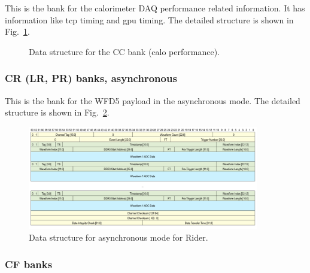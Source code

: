 This is the bank for the calorimeter DAQ performance related information.
It has information like tcp timing and gpu timing. The detailed structure is shown in Fig.~\ref{fig:CCBankFormat}.

\begin{figure}[htbp]
\centering
{}
\caption{Data structure for the CC bank (calo performance).}\label{fig:CCBankFormat}
\end{figure}

\subsubsection*{CR (LR, PR) banks, asynchronous}

This is the bank for the WFD5 payload in the asynchronous mode. The detailed structure is shown in Fig.~\ref{fig:AsyncRiderData}.

\begin{figure}[htbp]
\centering
\includegraphics[width=0.9\textwidth]{pics/AsyncRiderData.pdf} 
\caption{Data structure for asynchronous mode for Rider.}\label{fig:AsyncRiderData}
\end{figure}

\subsubsection*{CF banks}

